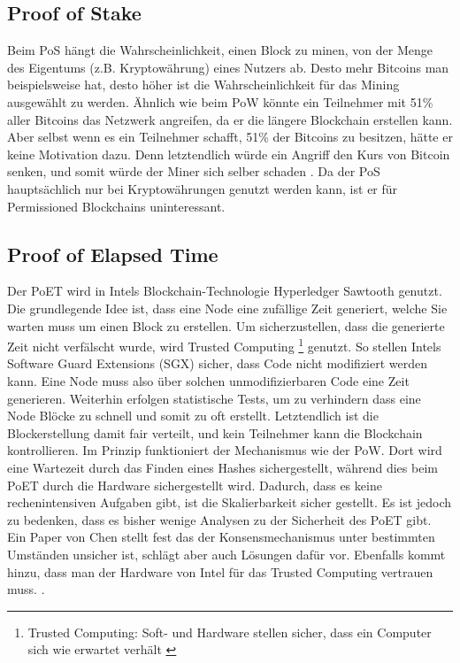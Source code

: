 \subsection{Proof of Stake}
Beim PoS hängt die Wahrscheinlichkeit, einen Block zu minen, von der Menge des Eigentums (z.B. Kryptowährung) eines Nutzers ab. Desto mehr Bitcoins man beispielsweise hat, desto höher ist die Wahrscheinlichkeit für das Mining ausgewählt zu werden. Ähnlich wie beim PoW könnte ein Teilnehmer mit 51\% aller Bitcoins das Netzwerk angreifen, da er die längere Blockchain erstellen kann. Aber selbst wenn es ein Teilnehmer schafft, 51\% der Bitcoins zu besitzen, hätte er keine Motivation dazu. Denn letztendlich würde ein Angriff den Kurs von Bitcoin senken, und somit würde der Miner sich selber schaden \cite{ZhengBlockchainChallengesOpportunities2017}. Da der PoS hauptsächlich nur bei Kryptowährungen genutzt werden kann, ist er für Permissioned Blockchains uninteressant.

\subsection{Proof of Elapsed Time}
Der PoET wird in Intels Blockchain-Technologie Hyperledger Sawtooth genutzt. Die grundlegende Idee ist, dass eine Node eine zufällige Zeit generiert, welche Sie warten muss um einen Block zu erstellen. Um sicherzustellen, dass die generierte Zeit nicht verfälscht wurde, wird Trusted Computing \footnote{Trusted Computing: Soft- und Hardware stellen sicher, dass ein Computer sich wie erwartet verhält \cite{TrustedComputing2018}} genutzt. So stellen Intels Software Guard Extensions (SGX) sicher, dass Code nicht modifiziert werden kann. Eine Node muss also über solchen unmodifizierbaren Code eine Zeit generieren. Weiterhin erfolgen statistische Tests, um zu verhindern dass eine Node Blöcke zu schnell und somit zu oft erstellt. Letztendlich ist die Blockerstellung damit fair verteilt, und kein Teilnehmer kann die Blockchain kontrollieren. Im Prinzip funktioniert der Mechanismus wie der PoW. Dort wird eine Wartezeit durch das Finden eines Hashes sichergestellt, während dies beim PoET durch die Hardware sichergestellt wird. Dadurch, dass es keine rechenintensiven Aufgaben gibt, ist die Skalierbarkeit sicher gestellt. Es ist jedoch zu bedenken, dass es bisher wenige Analysen zu der Sicherheit des PoET gibt. Ein Paper von Chen stellt fest das der Konsensmechanismus unter bestimmten Umständen unsicher ist, schlägt aber auch Lösungen dafür vor. Ebenfalls kommt hinzu, dass man der Hardware von Intel für das Trusted Computing vertrauen muss. \cite{ChenSecurityAnalysisProofofElapsedTime2017}.

